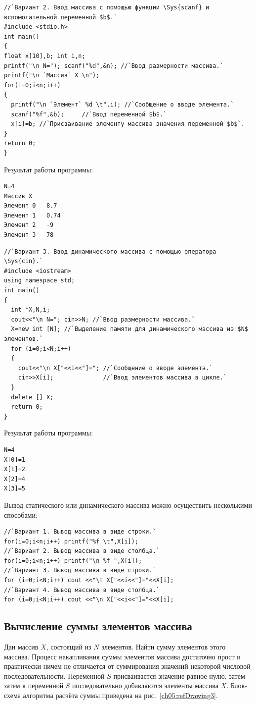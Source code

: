 \begin{lstlisting}
//`Вариант 2. Ввод массива с помощью функции \Sys{scanf} и вспомогательной переменной $b$.`
#include <stdio.h>
int main()
{
float x[10],b; int i,n; 
printf("\n N="); scanf("%d",&n); //`Ввод размерности массива.`
printf("\n `Массив` X \n"); 
for(i=0;i<n;i++) 
{ 
  printf("\n `Элемент` %d \t",i); //`Сообщение о вводе элемента.`
  scanf("%f",&b);     //`Ввод переменной $b$.`
  x[i]=b; //`Присваивание элементу массива значения переменной $b$`.
} 
return 0;
}
\end{lstlisting}

Результат работы программы:
\begin{verbatim}
N=4 
Массив X 
Элемент 0 	8.7 
Элемент 1 	0.74 
Элемент 2 	-9 
Элемент 3 	78 
\end{verbatim}

\begin{lstlisting}
//`Вариант 3. Ввод динамического массива с помощью оператора \Sys{cin}.`
#include <iostream>
using namespace std;
int main()
{
  int *X,N,i;
  cout<<"\n N="; cin>>N; //`Ввод размерности массива.`
  X=new int [N]; //`Выделение памяти для динамического массива из $N$ элементов.`
  for (i=0;i<N;i++)
  {
    cout<<"\n X["<<i<<"]="; //`Сообщение о вводе элемента.`
    cin>>X[i];              //`Ввод элементов массива в цикле.`
  }
  delete [] X;
  return 0;
}
\end{lstlisting}

Результат работы программы:
\begin{verbatim}
N=4 
X[0]=1 
X[1]=2 
X[2]=4 
X[3]=5 
\end{verbatim}

Вывод статического или динамического массива можно осуществить несколькими способами:

\begin{lstlisting}
//`Вариант 1. Вывод массива в виде строки.`
for(i=0;i<n;i++) printf("%f \t",X[i]);
//`Вариант 2. Вывод массива в виде столбца.`
for(i=0;i<n;i++) printf("\n %f ",X[i]);
//`Вариант 3. Вывод массива в виде строки.`
for (i=0;i<N;i++) cout <<"\t X["<<i<<"]="<<X[i];
//`Вариант 4. Вывод массива в виде столбца.`
for (i=0;i<N;i++) cout <<"\n X["<<i<<"]="<<X[i];
\end{lstlisting}

\subsection[Вычисление суммы элементов массива]{Вычисление суммы элементов массива}
Дан массив $X$, состоящий из $N$ элементов. Найти сумму элементов этого массива.
Процесс накапливания суммы элементов массива достаточно прост и практически
ничем не отличается от суммирования значений некоторой числовой последовательности. Переменной $S$
присваивается значение равное нулю, затем затем к переменной $S$ последовательно добавляются элементы
 массива $X$. Блок-схема
алгоритма расчёта суммы приведена на рис.~\ref{ch05:refDrawing3}.

